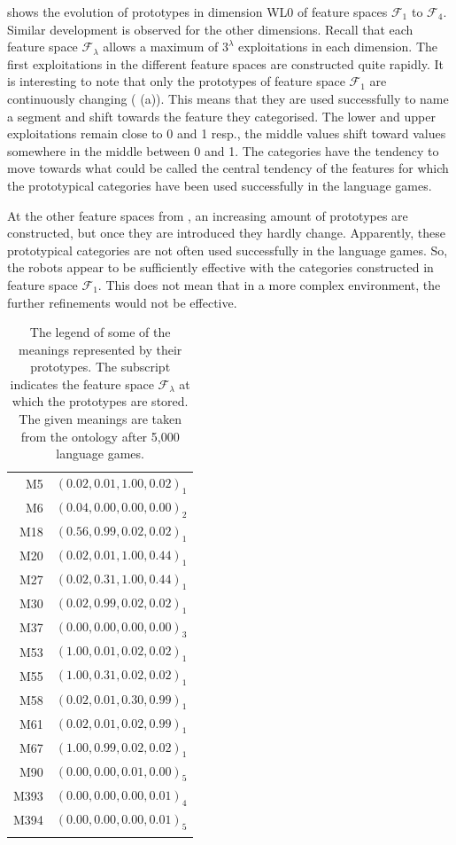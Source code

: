  shows the evolution of prototypes in dimension WL0 of feature spaces ${\mathcal F}_1$ to ${\mathcal F}_4$. Similar development is observed for the other dimensions. Recall that each feature space ${\mathcal F}_\lambda$ allows a maximum of $3^\lambda$ exploitations in each dimension. The first exploitations in the different feature spaces are constructed quite rapidly. It is interesting to note that only the prototypes of feature space ${\mathcal F}_1$  are continuously changing ( (a)). This means that they are used successfully to name a segment and shift towards the feature they categorised. The lower and upper exploitations remain close to 0 and 1 resp., the middle values shift toward values somewhere in the middle between 0 and 1. The categories have the tendency to move towards what could be called the central tendency of the features for which the prototypical categories have been used successfully in the language games. 

At the other feature spaces from , an increasing amount of prototypes are constructed, but once they are introduced they hardly change. Apparently, these prototypical categories are not often used successfully in the language games. So, the robots appear to be sufficiently effective with the categories constructed in feature space ${\mathcal F}_1$. This does not mean that in a more complex environment, the further refinements would not be effective.

\begin{table}
\centering
\begin{tabular}{rr}
\lsptoprule
M5 & $(0.02, 0.01, 1.00, 0.02)_1$\\%
M6 & $(0.04, 0.00, 0.00, 0.00)_2$\\%
M18 & $(0.56, 0.99, 0.02, 0.02)_1$\\%
M20 & $(0.02, 0.01, 1.00, 0.44)_1$\\%
M27 & $(0.02, 0.31, 1.00, 0.44)_1$\\%
M30 & $(0.02, 0.99, 0.02, 0.02)_1$\\%
M37 & $(0.00, 0.00, 0.00, 0.00)_3$\\%
M53 & $(1.00, 0.01, 0.02, 0.02)_1$\\%
M55 & $(1.00, 0.31, 0.02, 0.02)_1$\\%
M58 & $(0.02, 0.01, 0.30, 0.99)_1$\\%
M61 & $(0.02, 0.01, 0.02, 0.99)_1$\\%
M67 & $(1.00, 0.99, 0.02, 0.02)_1$\\%
M90 & $(0.00, 0.00, 0.01, 0.00)_5$\\%
M393 & $(0.00, 0.00, 0.00, 0.01)_4$\\%
M394 & $(0.00, 0.00, 0.00, 0.01)_5$\\%
\lspbottomrule
\end{tabular}
\caption{The legend of some of the meanings represented by their prototypes. The subscript indicates the feature space ${\mathcal F}_\lambda$ at which the prototypes are stored. The given meanings are taken from the ontology after 5,000 language games.}
\label{t:st:legend}
\end{table}



